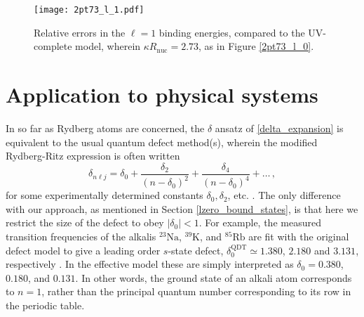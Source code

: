 \documentclass[pra,twocolumn,nofootinbib, superscriptaddress]{revtex4}%
\def\sec#1{\section{#1} }
\def\({\left(}
\def\){\right)}
\def\f#1#2{\frac{#1}{#2}}
\def\de{\delta}
\def\k{\kappa}
\providecommand{\abs}[1]{\left\lvert#1\right\rvert}
\begin{document}
\begin{figure}[htp]
  \begin{center}
    \texttt{[image: 2pt73\_l\_1.pdf]}
  \end{center}
  \caption{Relative errors in the $\ell=1$ binding energies, compared to the UV-complete model, wherein $\k R_\text{nuc}=2.73$, as in Figure \ref{2pt73_l_0}.}
  \label{2pt73_l_1}
  \end{figure}






\sec{Application to physical systems}\label{Sec:DataApplications}


In so far as Rydberg atoms are concerned, the $\de$ ansatz of \eqref{delta_expansion} is equivalent to the usual quantum defect method(s), wherein the modified Rydberg-Ritz expression is often written 
\begin{equation}\label{Gallagher_defect}
\de_{n\ell j} = \de_0 + \f{\de_2}{\(n-\de_0\)^2} + \f{\de_4}{\(n-\de_0\)^4} + \dots\,,
\end{equation}
for some experimentally determined constants $\de_0, \de_2$, etc. \cite{gallagher_1994}. The only difference with our approach, as mentioned in Section \ref{lzero_bound_states}, is that here we restrict the size of the defect to obey $\abs{\de_0}<1$. For example, the measured transition frequencies of the alkalis $^{23}\text{Na}$, $^{39}\text{K}$, and $^{85}\text{Rb}$ are fit with the original defect model to give a leading order $s$-state defect, $\de_{0}^\text{QDT}\simeq1.380$, $2.180$ and $3.131$, respectively \cite{gallagher_1994}. In the effective model these are simply interpreted as $\de_0=0.380$, $0.180$, and $0.131$. In other words, the ground state of an alkali atom corresponds to $n=1$, rather than the principal quantum number corresponding to its row in the periodic table.
\end{document}
